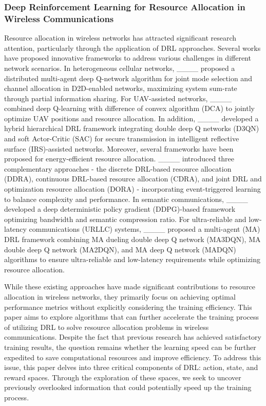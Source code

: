 \subsubsection{Deep Reinforcement Learning for Resource Allocation in Wireless Communications}

Resource allocation in wireless networks has attracted significant research attention, particularly through the application of DRL approaches. Several works have proposed innovative frameworks to address various challenges in different network scenarios. In heterogeneous cellular networks, ____ proposed a distributed multi-agent deep Q-network algorithm for joint mode selection and channel allocation in D2D-enabled networks, maximizing system sum-rate through partial information sharing. For UAV-assisted networks, ____ combined deep Q-learning with difference of convex algorithm (DCA) to jointly optimize UAV positions and resource allocation. In addition, ____ developed a hybrid hierarchical DRL framework integrating double deep Q networks (D3QN) and soft Actor-Critic (SAC) for secure transmission in intelligent reflective surface (IRS)-assisted networks. Moreover,
several frameworks have been proposed for energy-efficient resource allocation. ____ introduced three complementary approaches - the discrete DRL-based resource allocation (DDRA), continuous DRL-based resource allocation (CDRA), and joint DRL and optimization resource allocation (DORA) - incorporating event-triggered learning to balance complexity and performance. In semantic communications, ____ developed a deep deterministic policy gradient (DDPG)-based framework optimizing bandwidth and semantic compression ratio. For ultra-reliable and low-latency communications (URLLC) systems, ____ proposed a multi-agent (MA) DRL framework combining MA dueling double deep Q network (MA3DQN), MA double deep Q network (MA2DQN), and  MA deep Q network (MADQN) algorithms to ensure ultra-reliable and low-latency requirements while optimizing resource allocation.

While these existing approaches have made significant contributions to resource allocation in wireless networks, they primarily focus on achieving optimal performance metrics without explicitly considering the training efficiency. This paper aims to explore algorithms that can further accelerate the training process of utilizing DRL to solve resource allocation problems in wireless communications. Despite the fact that previous research has achieved satisfactory training results, the question remains whether the learning speed can be further expedited to save computational resources and improve efficiency. To address this issue, this paper delves into three critical components of DRL: action, state, and reward spaces. Through the exploration of these spaces, we seek to uncover previously overlooked information that could potentially speed up the training process.


